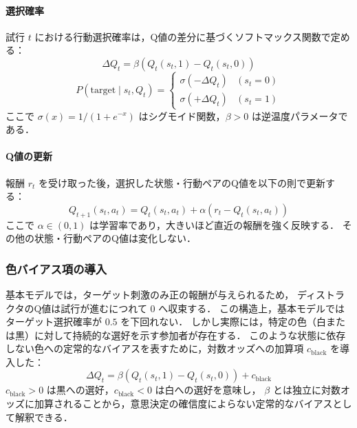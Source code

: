 \documentclass[dvipdfmx]{jsarticle}
\begin{document}
\paragraph{選択確率}
試行 $t$ における行動選択確率は，Q値の差分に基づくソフトマックス関数で定める：
\begin{equation}
    \Delta Q_t = \beta \left( Q_t(s_t, 1) - Q_t(s_t, 0) \right)
\end{equation}
\begin{equation}
    P(\text{target} \mid s_t, Q_t) =
    \begin{cases}
        \sigma(-\Delta Q_t) & (s_t = 0) \\
        \sigma(+\Delta Q_t) & (s_t = 1)
    \end{cases}
\end{equation}
ここで $\sigma(x) = 1/(1 + e^{-x})$ はシグモイド関数，$\beta > 0$ は逆温度パラメータである．

\paragraph{Q値の更新}
報酬 $r_t$ を受け取った後，選択した状態・行動ペアのQ値を以下の則で更新する：
\begin{equation}
    Q_{t+1}(s_t, a_t) = Q_t(s_t, a_t) + \alpha \left( r_t - Q_t(s_t, a_t) \right)
\end{equation}
ここで $\alpha \in (0, 1)$ は学習率であり，大きいほど直近の報酬を強く反映する．
その他の状態・行動ペアのQ値は変化しない．

\subsubsection{色バイアス項の導入}

基本モデルでは，ターゲット刺激のみ正の報酬が与えられるため，
ディストラクタのQ値は試行が進むにつれて $0$ へ収束する．
この構造上，基本モデルではターゲット選択確率が $0.5$ を下回れない．
しかし実際には，特定の色（白または黒）に対して持続的な選好を示す参加者が存在する．
このような状態に依存しない色への定常的なバイアスを表すために，対数オッズへの加算項 $c_\mathrm{black}$ を導入した：
\begin{equation}
    \Delta Q_t = \beta \left( Q_t(s_t, 1) - Q_t(s_t, 0) \right) + c_\mathrm{black}
\end{equation}
$c_\mathrm{black} > 0$ は黒への選好，$c_\mathrm{black} < 0$ は白への選好を意味し，
$\beta$ とは独立に対数オッズに加算されることから，意思決定の確信度によらない定常的なバイアスとして解釈できる．
\end{document}
